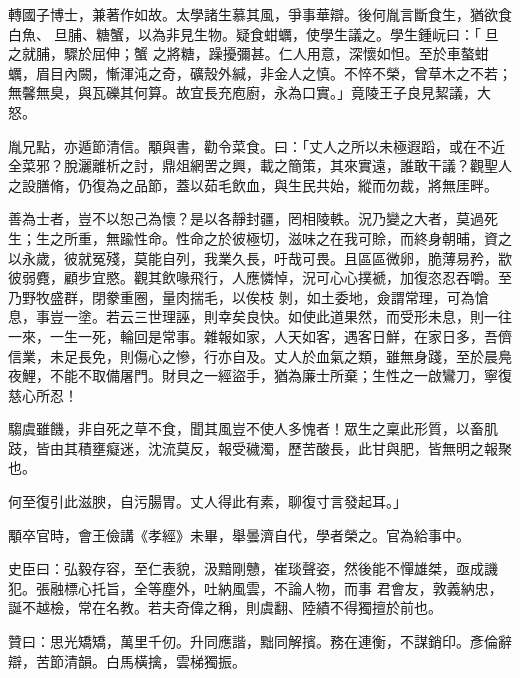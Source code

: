 \begin{pinyinscope}
 轉國子博士，兼著作如故。太學諸生慕其風，爭事華辯。後何胤言斷食生，猶欲食白魚、旦脯、糖蟹，以為非見生物。疑食蚶蠣，使學生議之。學生鍾岏曰：「旦之就脯，驟於屈伸；蟹
 之將糖，躁擾彌甚。仁人用意，深懷如怛。至於車螯蚶蠣，眉目內闕，慚渾沌之奇，礦殼外緘，非金人之慎。不悴不榮，曾草木之不若；無馨無臭，與瓦礫其何算。故宜長充庖廚，永為口實。」竟陵王子良見絜議，大怒。



 胤兄點，亦遁節清信。顒與書，勸令菜食。曰：「丈人之所以未極遐蹈，或在不近全菜邪？脫灑離析之討，鼎俎網罟之興，載之簡策，其來實遠，誰敢干議？觀聖人之設膳脩，仍復為之品節，蓋以茹毛飲血，與生民共始，縱而勿裁，將無厓畔。



 善為士者，豈不以恕己為懷？是以各靜封疆，罔相陵軼。況乃變之大者，莫過死生；生之所重，無踰性命。性命之於彼極切，滋味之在我可賒，而終身朝晡，資之以永歲，彼就冤殘，莫能自列，我業久長，吁哉可畏。且區區微卵，脆薄易矜，歂彼弱麑，顧步宜愍。觀其飲喙飛行，人應憐悼，況可心心撲褫，加復恣忍吞嚼。至乃野牧盛群，閉豢重圈，量肉揣毛，以俟枝
 剝，如土委地，僉謂常理，可為愴息，事豈一塗。若云三世理誣，則幸矣良快。如使此道果然，而受形未息，則一往一來，一生一死，輪回是常事。雜報如家，人天如客，遇客日鮮，在家日多，吾儕信業，未足長免，則傷心之慘，行亦自及。丈人於血氣之類，雖無身踐，至於晨鳧夜鯉，不能不取備屠門。財貝之一經盜手，猶為廉士所棄；生性之一啟鸞刀，寧復慈心所忍！



 騶虞雖饑，非自死之草不食，聞其風豈不使人多愧者！眾生之稟此形質，以畜肌跂，皆由其積壅癡迷，沈流莫反，報受穢濁，歷苦酸長，此甘與肥，皆無明之報聚也。



 何至復引此滋腴，自污腸胃。丈人得此有素，聊復寸言發起耳。」



 顒卒官時，會王儉講《孝經》未畢，舉曇濟自代，學者榮之。官為給事中。



 史臣曰：弘毅存容，至仁表貌，汲黯剛戇，崔琰聲姿，然後能不憚雄桀，亟成譏犯。張融標心托旨，全等塵外，吐納風雲，不論人物，而事
 君會友，敦義納忠，誕不越檢，常在名教。若夫奇偉之稱，則虞翻、陸績不得獨擅於前也。



 贊曰：思光矯矯，萬里千仞。升同應諧，黜同解擯。務在連衡，不謀銷印。彥倫辭辯，苦節清韻。白馬橫擒，雲梯獨振。



\end{pinyinscope}